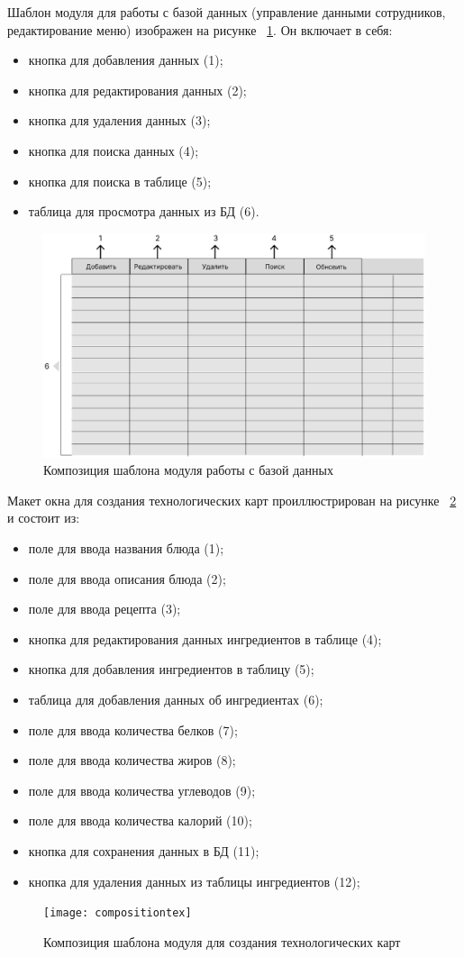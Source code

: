 \newpage
Шаблон модуля для работы с базой данных (управление данными сотрудников, редактирование меню) изображен на рисунке ~\ref{composition1:image}. Он включает в себя:
\begin{itemize}
	\item кнопка для добавления данных (1);
	\item кнопка для редактирования данных (2);
	\item кнопка для удаления данных (3);
	\item кнопка для поиска данных (4);
	\item кнопка для поиска в таблице (5);
	\item таблица для просмотра данных из БД (6).
\end{itemize}
\begin{figure}[ht]
	\centering
	\includegraphics[width=0.7\linewidth]{composition1}
	\caption{Композиция шаблона модуля работы с базой данных}
	\label{composition1:image}
\end{figure}

\newpage
Макет окна для создания технологических карт проиллюстрирован на рисунке ~\ref{compositiontex:image} и состоит из:
\begin{itemize}
	\item поле для ввода названия блюда (1);
	\item поле для ввода описания блюда (2);
	\item поле для ввода рецепта (3);
	\item кнопка для редактирования данных ингредиентов в таблице (4);
	\item кнопка для добавления ингредиентов в таблицу (5);
	\item таблица для добавления данных об ингредиентах (6);
	\item поле для ввода количества белков (7);
	\item поле для ввода количества жиров (8);
	\item поле для ввода количества углеводов (9);
	\item поле для ввода количества калорий (10);
	\item кнопка для сохранения данных в БД (11);
	\item кнопка для удаления данных из таблицы ингредиентов (12);
\end{itemize}
\begin{figure}[ht]
	\centering
	\texttt{[image: compositiontex]}
	\caption{Композиция шаблона модуля для создания технологических карт}
	\label{compositiontex:image}
\end{figure}


